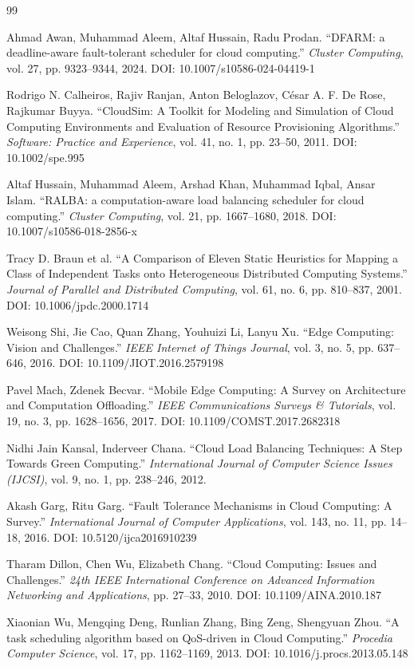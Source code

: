 \documentclass[12pt]{report}
\begin{document}
\begin{thebibliography}{99}

Ahmad Awan, Muhammad Aleem, Altaf Hussain, Radu Prodan.
``DFARM: a deadline-aware fault-tolerant scheduler for cloud computing.''
\textit{Cluster Computing}, vol. 27, pp. 9323–9344, 2024.
DOI: 10.1007/s10586-024-04419-1

Rodrigo N. Calheiros, Rajiv Ranjan, Anton Beloglazov, César A. F. De Rose, Rajkumar Buyya.
``CloudSim: A Toolkit for Modeling and Simulation of Cloud Computing Environments and Evaluation of Resource Provisioning Algorithms.''
\textit{Software: Practice and Experience}, vol. 41, no. 1, pp. 23–50, 2011.
DOI: 10.1002/spe.995

Altaf Hussain, Muhammad Aleem, Arshad Khan, Muhammad Iqbal, Ansar Islam.
``RALBA: a computation-aware load balancing scheduler for cloud computing.''
\textit{Cluster Computing}, vol. 21, pp. 1667–1680, 2018.
DOI: 10.1007/s10586-018-2856-x

Tracy D. Braun et al.
``A Comparison of Eleven Static Heuristics for Mapping a Class of Independent Tasks onto Heterogeneous Distributed Computing Systems.''
\textit{Journal of Parallel and Distributed Computing}, vol. 61, no. 6, pp. 810–837, 2001.
DOI: 10.1006/jpdc.2000.1714

Weisong Shi, Jie Cao, Quan Zhang, Youhuizi Li, Lanyu Xu.
``Edge Computing: Vision and Challenges.''
\textit{IEEE Internet of Things Journal}, vol. 3, no. 5, pp. 637–646, 2016.
DOI: 10.1109/JIOT.2016.2579198

Pavel Mach, Zdenek Becvar.
``Mobile Edge Computing: A Survey on Architecture and Computation Offloading.''
\textit{IEEE Communications Surveys \& Tutorials}, vol. 19, no. 3, pp. 1628–1656, 2017.
DOI: 10.1109/COMST.2017.2682318

Nidhi Jain Kansal, Inderveer Chana.
``Cloud Load Balancing Techniques: A Step Towards Green Computing.''
\textit{International Journal of Computer Science Issues (IJCSI)}, vol. 9, no. 1, pp. 238–246, 2012.

Akash Garg, Ritu Garg.
``Fault Tolerance Mechanisms in Cloud Computing: A Survey.''
\textit{International Journal of Computer Applications}, vol. 143, no. 11, pp. 14–18, 2016.
DOI: 10.5120/ijca2016910239

Tharam Dillon, Chen Wu, Elizabeth Chang.
``Cloud Computing: Issues and Challenges.''
\textit{24th IEEE International Conference on Advanced Information Networking and Applications}, pp. 27–33, 2010.
DOI: 10.1109/AINA.2010.187

Xiaonian Wu, Mengqing Deng, Runlian Zhang, Bing Zeng, Shengyuan Zhou.
``A task scheduling algorithm based on QoS-driven in Cloud Computing.''
\textit{Procedia Computer Science}, vol. 17, pp. 1162–1169, 2013.
DOI: 10.1016/j.procs.2013.05.148

\end{thebibliography}
\end{document}
